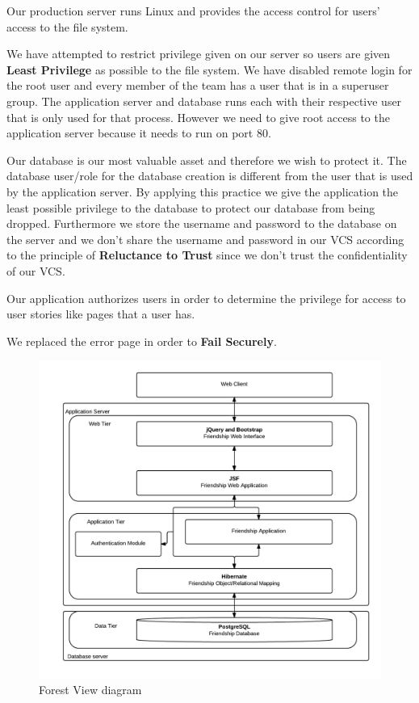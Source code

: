 \documentclass[a4paper]{article}
\begin{document}
Our production server runs Linux and provides the access control for users' access to the file system.

We have attempted to restrict privilege given on our server so users are given 
\textbf{Least Privilege} as possible to the file system. We have disabled remote login for the root user and every member of the team has a user that is in a superuser group. The application server and database runs each with their respective user that is only used for that process. However we need to give root access to the application server because it needs to run on port 80.


Our database is our most valuable asset and therefore we wish to protect it. The database user/role for the database creation is different from the user that is used by the application server. By applying this practice we give the application the least possible privilege to the database to protect our database from being dropped. Furthermore we store the username and password to the database on the server and we don't share the username and password in our VCS according to the principle of \textbf{Reluctance to Trust} since we don't trust the confidentiality of our VCS.

Our application authorizes users in order to determine the privilege for access to user stories like pages that a user has.

We replaced the error page in order to \textbf{Fail Securely}.
\begin{figure}[h!]
\centering
\includegraphics[scale=0.3]{ForestView}
\caption{Forest View diagram}
\label{fig:forest_view}
\end{figure}
\end{document}
